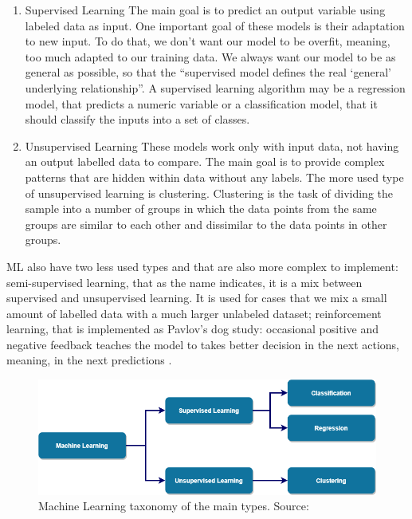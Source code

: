 \begin{enumerate}
    \item{Supervised Learning}
The main goal is to predict an output variable using labeled data as input. One important goal of these models is their adaptation to new input. To do that, we don’t want our model to be overfit, meaning, too much adapted to our training data. We always want our model to be as general as possible, so that the “supervised model defines the real ‘general’ underlying relationship”. A supervised learning algorithm may be a regression model, that predicts a numeric variable or a classification model, that it should classify the inputs into a set of classes.

    \item{Unsupervised Learning}
These models work only with input data, not having an output labelled data to compare. The main goal is to provide complex patterns that are hidden within data without any labels. The more used type of unsupervised learning is clustering. Clustering is the task of dividing the sample into a number of groups in which the data points from the same groups are similar to each other and dissimilar to the data points in other groups.
\end{enumerate}

ML also have two less used types and that are also more complex to implement: semi-supervised learning, that as the name indicates, it is a mix between supervised and unsupervised learning. It is used for cases that we mix a small amount of labelled data with a much larger unlabeled dataset; reinforcement learning, that is implemented as Pavlov’s dog study: occasional positive and negative feedback teaches the model to takes better decision in the next actions, meaning, in the next predictions \cite{46_ML}.

\begin{figure}[htbp]
	\centering
	\includegraphics[width=\textwidth]{Chapters/Figures/background_fig9.PNG}
	\caption{Machine Learning taxonomy of the main types. Source: \cite{FCT_AA} }
	\label{fig:Figuras_Tree_silhouettes-vectorial}
\end{figure}


